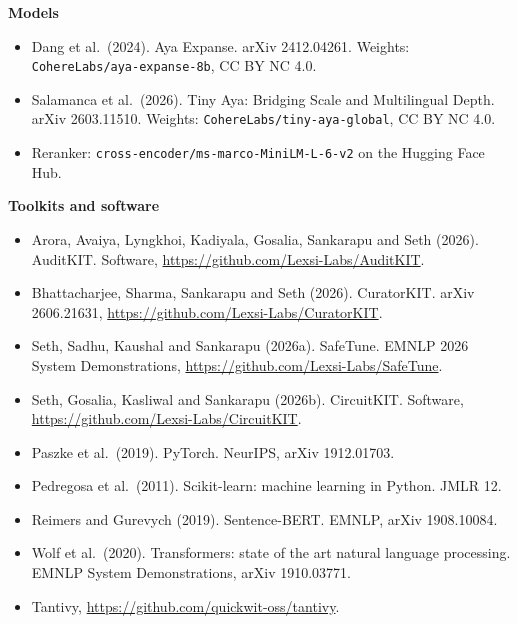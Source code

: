 \documentclass[11pt,a4paper]{article}
\begin{document}
\textbf{Models}
\begin{itemize}\setlength\itemsep{0.15em}
\item Dang et al.\ (2024). Aya Expanse. arXiv 2412.04261. Weights: \nolinkurl{CohereLabs/aya-expanse-8b}, CC BY NC 4.0.
\item Salamanca et al.\ (2026). Tiny Aya: Bridging Scale and Multilingual Depth. arXiv 2603.11510. Weights: \nolinkurl{CohereLabs/tiny-aya-global}, CC BY NC 4.0.
\item Reranker: \nolinkurl{cross-encoder/ms-marco-MiniLM-L-6-v2} on the Hugging Face Hub.
\end{itemize}

\textbf{Toolkits and software}
\begin{itemize}\setlength\itemsep{0.15em}
\item Arora, Avaiya, Lyngkhoi, Kadiyala, Gosalia, Sankarapu and Seth (2026). AuditKIT. Software, \url{https://github.com/Lexsi-Labs/AuditKIT}.
\item Bhattacharjee, Sharma, Sankarapu and Seth (2026). CuratorKIT. arXiv 2606.21631, \url{https://github.com/Lexsi-Labs/CuratorKIT}.
\item Seth, Sadhu, Kaushal and Sankarapu (2026a). SafeTune. EMNLP 2026 System Demonstrations, \url{https://github.com/Lexsi-Labs/SafeTune}.
\item Seth, Gosalia, Kasliwal and Sankarapu (2026b). CircuitKIT. Software, \url{https://github.com/Lexsi-Labs/CircuitKIT}.
\item Paszke et al.\ (2019). PyTorch. NeurIPS, arXiv 1912.01703.
\item Pedregosa et al.\ (2011). Scikit-learn: machine learning in Python. JMLR 12.
\item Reimers and Gurevych (2019). Sentence-BERT. EMNLP, arXiv 1908.10084.
\item Wolf et al.\ (2020). Transformers: state of the art natural language processing. EMNLP System Demonstrations, arXiv 1910.03771.
\item Tantivy, \url{https://github.com/quickwit-oss/tantivy}.
\end{itemize}
\end{document}
